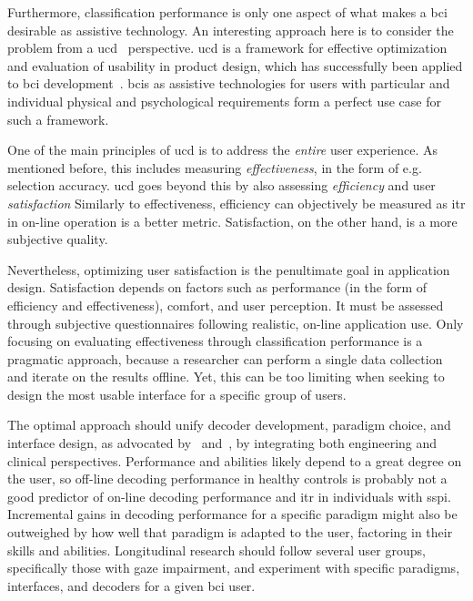 Furthermore, classification performance is only one aspect of what makes a \ac{bci}
desirable as assistive technology.
An interesting approach here is to consider the problem from a
\ac{ucd}~\cite{Standardization2009} perspective.
\Ac{ucd} is a framework for effective optimization and evaluation of usability
in product design, which has successfully been applied to \ac{bci}
development~\cite{Schreuder2013,Kuebler2014,Han2022}.
\Acp{bci} as assistive technologies for users with particular and individual
physical and psychological requirements form a perfect use case for such a framework.

One of the main principles of \ac{ucd} is to address the \emph{entire} user
experience.
As mentioned before, this includes measuring \emph{effectiveness}, in the form
of e.g. selection accuracy.
\Ac{ucd} goes beyond this by also assessing \emph{efficiency} and user
\emph{satisfaction}
Similarly to effectiveness, efficiency can objectively be measured as \ac{itr}
in on-line operation is a better metric.
Satisfaction, on the other hand, is a more subjective quality.

Nevertheless, optimizing user satisfaction is the penultimate goal in
application design.
Satisfaction depends on factors such as performance (in the form of efficiency
and effectiveness), comfort, and user perception.
It must be assessed through subjective questionnaires following realistic, on-line
application use\cite{Kuebler2014}.
Only focusing on evaluating effectiveness through classification performance is
a pragmatic approach, because a researcher can perform a single
data collection and iterate on the results offline.
Yet, this can be too limiting when seeking to design the most usable interface
for a specific group of users.

The optimal approach should unify decoder development, paradigm choice, and interface
design, as advocated by~\textcite{Pan2022} and~\textcite{Fouad2020}, by integrating both
engineering and clinical perspectives.
Performance and abilities likely depend to a great degree on the user,
so off-line decoding performance in healthy controls is probably not a good
predictor of on-line decoding performance and \ac{itr} in individuals with
\ac{sspi}.
Incremental gains in decoding performance for a specific paradigm might
also be outweighed by how well that paradigm is adapted to the user, factoring in
their skills and abilities.
Longitudinal research should follow several user groups, specifically those with gaze
impairment, and experiment with specific paradigms, interfaces, and decoders for
a given \ac{bci} user.

